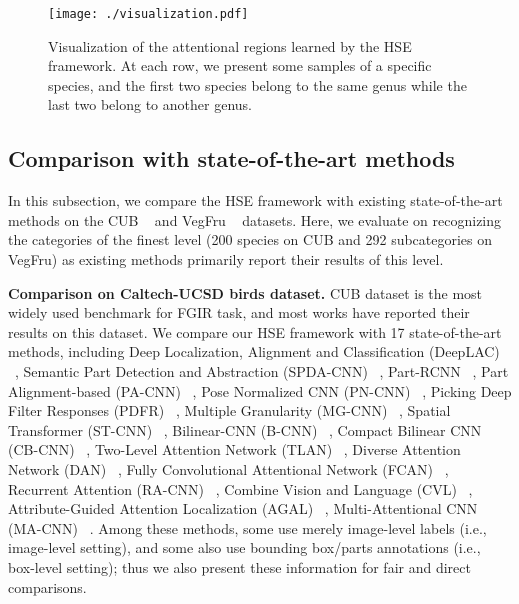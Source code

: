 \documentclass[sigconf]{acmart}
\begin{document}
\begin{figure}[!t]
   \centering
   \texttt{[image: ./visualization.pdf]} \caption{Visualization of the attentional regions learned by the HSE framework. At each row, we present some samples of a specific species, and the first two species belong to the same genus while the last two belong to another genus.}
   \label{fig:vis}
\end{figure} 


\subsection{Comparison with state-of-the-art methods}
In this subsection, we compare the HSE framework with existing state-of-the-art methods on the CUB ~\cite{wah2011caltech} and VegFru ~\cite{hou2017vegfru} datasets. Here, we evaluate on recognizing the categories of the finest level (200 species on CUB and 292 subcategories on VegFru) as existing methods primarily report their results of this level.

\noindent\textbf{Comparison on Caltech-UCSD birds dataset. } CUB dataset is the most widely used benchmark for FGIR task, and most works have reported their results on this dataset. We compare our HSE framework with 17 state-of-the-art methods, including Deep Localization, Alignment and Classification (DeepLAC) ~\cite{lin2015deep}, Semantic Part Detection and Abstraction (SPDA-CNN) ~\cite{zhang2016spda}, Part-RCNN ~\cite{zhang2014part}, Part Alignment-based (PA-CNN) ~\cite{krause2015fine}, Pose Normalized CNN (PN-CNN) ~\cite{branson2014bird}, Picking Deep Filter Responses (PDFR) ~\cite{zhang2016picking}, Multiple Granularity (MG-CNN) ~\cite{wang2015multiple}, Spatial Transformer (ST-CNN) ~\cite{jaderberg2015spatial}, Bilinear-CNN (B-CNN) ~\cite{lin2015bilinear}, Compact Bilinear CNN (CB-CNN) ~\cite{gao2016compact}, Two-Level Attention Network (TLAN) ~\cite{xiao2015application}, Diverse Attention Network (DAN) ~\cite{zhao2017diversified}, Fully Convolutional Attentional Network (FCAN) ~\cite{liu2016fully}, Recurrent Attention (RA-CNN) ~\cite{fu2017look}, Combine Vision and Language (CVL) ~\cite{he2017fine}, Attribute-Guided Attention Localization (AGAL) ~\cite{liu2017localizing}, Multi-Attentional CNN (MA-CNN) ~\cite{zheng2017learning}. Among these methods, some use merely image-level labels (i.e., image-level setting), and some also use bounding box/parts annotations (i.e., box-level setting); thus we also present these information for fair and direct comparisons. 
\end{document}
